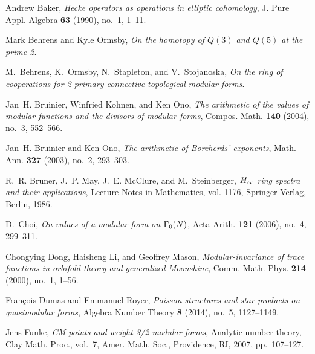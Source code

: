 \documentclass{gtpart}
\theoremstyle{definition}
\theoremstyle{remark}
\renewcommand{\=}{\approx}
\renewcommand{\-}{\sim}
\numberwithin{equation}{section}
\begin{document}
\begin{thebibliography}
Andrew Baker, \emph{Hecke operators as operations in elliptic cohomology}, J. 
  Pure Appl. Algebra \textbf{63} (1990), no.~1, 1--11. 

Mark Behrens and Kyle Ormsby, \emph{On the homotopy of {$Q(3)$} and {$Q(5)$} at
  the prime 2}.  

M.~Behrens, K.~Ormsby, N.~Stapleton, and V.~Stojanoska, \emph{On the ring of
  cooperations for 2-primary connective topological modular forms}. 

Jan~H. Bruinier, Winfried Kohnen, and Ken Ono, \emph{The arithmetic of the
  values of modular functions and the divisors of modular forms}, Compos. Math.
  \textbf{140} (2004), no.~3, 552--566. 

Jan~H. Bruinier and Ken Ono, \emph{The arithmetic of {B}orcherds' exponents},
  Math. Ann. \textbf{327} (2003), no.~2, 293--303. 

R.~R. Bruner, J.~P. May, J.~E. McClure, and M.~Steinberger, \emph{{$H\sb \infty
  $} ring spectra and their applications}, Lecture Notes in Mathematics, vol.
  1176, Springer-Verlag, Berlin, 1986. 

D.~Choi, \emph{On values of a modular form on {$\Gamma\sb 0(N)$}}, Acta Arith.
  \textbf{121} (2006), no.~4, 299--311. 

Chongying Dong, Haisheng Li, and Geoffrey Mason, \emph{Modular-invariance of
  trace functions in orbifold theory and generalized {M}oonshine}, Comm. Math.
  Phys. \textbf{214} (2000), no.~1, 1--56. 

Fran{\c{c}}ois Dumas and Emmanuel Royer, \emph{Poisson structures and star
  products on quasimodular forms}, Algebra Number Theory \textbf{8} (2014),
  no.~5, 1127--1149. \linebreak {}

Jens Funke, \emph{C{M} points and weight 3/2 modular forms}, Analytic number
  theory, Clay Math. Proc., vol.~7, Amer. Math. Soc., Providence, RI, 2007,
  pp.~107--127. 


\end{thebibliography}
\end{document}
